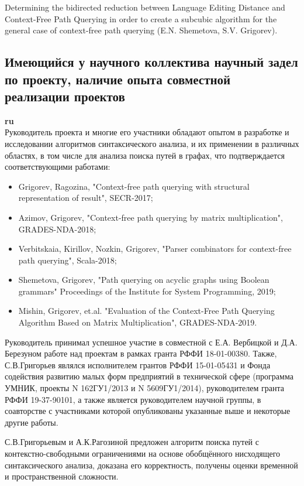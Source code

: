 \documentclass[12pt]{article}  %
\theoremstyle{remark}
\begin{document}
Determining the bidirected reduction between Language Editing Distance and Context-Free Path Querying in order to create a subcubic algorithm for the general case of context-free path querying (E.N. Shemetova, S.V. Grigorev).

\subsection{Имеющийся у научного коллектива научный задел по проекту, наличие опыта совместной реализации проектов}

\textbf{ru}\\
%
Руководитель проекта и многие его участники обладают опытом в разработке и исследовании алгоритмов синтаксического анализа, и их применении в различных областях, в том числе для анализа поиска путей в графах, что подтверждается соответствующими работами:
\begin{itemize}
  \item Grigorev, Ragozina, "Context-free path querying with structural representation of result", SECR-2017;
  \item Azimov, Grigorev, "Context-free path querying by matrix multiplication", GRADES-NDA-2018;
  \item Verbitskaia, Kirillov, Nozkin, Grigorev, "Parser combinators for context-free path querying", Scala-2018;
  \item Shemetova, Grigorev, "Path querying on acyclic graphs using Boolean grammars" Proceedings of the Institute for System Programming, 2019;
  \item Mishin, Grigorev, et.al. "Evaluation of the Context-Free Path Querying Algorithm Based on Matrix Multiplication", GRADES-NDA-2019.
\end{itemize}

Руководитель принимал успешное участие в совместной с Е.А. Вербицкой и Д.А. Березуном работе над проектам в рамках гранта РФФИ 18-01-00380. Также, С.В.Григорьев являлся исполнителем грантов РФФИ 15-01-05431 и Фонда содействия развитию малых форм предприятий в технической сфере (программа УМНИК, проекты N 162ГУ1/2013 и N 5609ГУ1/2014), руководителем гранта РФФИ 19-37-90101, а также является руководителем научной группы, в соавторстве с участниками которой опубликованы указанные выше и некоторые другие работы.

С.В.Григорьевым и А.К.Рагозиной предложен алгоритм поиска путей с контекстно-свободными ограничениями на основе обобщённого нисходящего синтаксического анализа, доказана его корректность, получены оценки временной и пространственной сложности.
\end{document}
